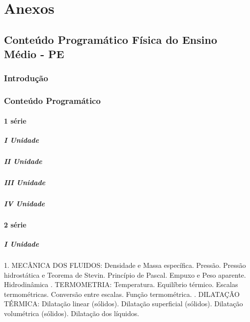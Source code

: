 \documentclass[12pt,a4paper]{book}
\begin{document}
\part{Anexos}
\chapter{Conteúdo Programático Física do Ensino Médio - PE}
	\section{Introdução}
	\section{Conteúdo Programático}
		\subsection{1 série}
		
			\subsubsection{I Unidade}
			
			
			\subsubsection{II Unidade}
			
			
			\subsubsection{III Unidade}
			
			
			\subsubsection{IV Unidade}
							
		
		\subsection{2 série}
					
			\subsubsection{I Unidade}
1. MECÂNICA DOS FLUIDOS: Densidade e Massa específica. Pressão. Pressão hidrostática e Teorema de Stevin. Princípio de Pascal.
Empuxo e Peso aparente. Hidrodinâmica .	TERMOMETRIA: Temperatura. Equilíbrio térmico. Escalas termométricas. Conversão entre escalas. Função termométrica. .	DILATAÇÃO TÉRMICA: Dilatação linear (sólidos). Dilatação superficial (sólidos). Dilatação volumétrica (sólidos). Dilatação dos líquidos.
\end{document}
